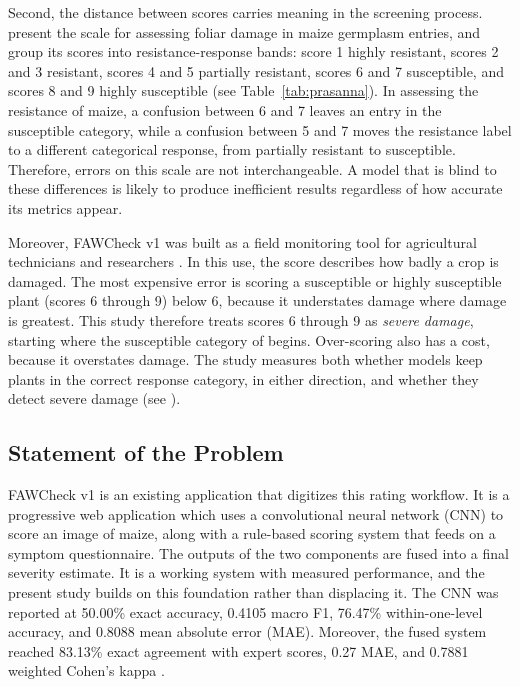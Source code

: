 \documentclass{icsthesis}
\newcommand{\secref}[1]{\textit{\nameref{#1}}}
\begin{document}
\begin{mainmatter}
				Second, the distance between scores carries meaning in the screening process.
				\citet{prasanna2018} present the scale for assessing foliar damage in maize
				germplasm entries, and group its scores into resistance-response bands: score 1
				highly resistant, scores 2 and 3 resistant, scores 4 and 5 partially resistant,
				scores 6 and 7 susceptible, and scores 8 and 9 highly susceptible (see
				Table~\ref{tab:prasanna}). In assessing the resistance of maize, a confusion between
				6 and 7 leaves an entry in the susceptible category, while a confusion between 5 and
				7 moves the resistance label to a different categorical response, from partially
				resistant to susceptible. Therefore, errors on this scale are not interchangeable. A
				model that is blind to these differences is likely to produce inefficient results
				regardless of how accurate its metrics appear.

				Moreover, FAWCheck v1 was built as a field monitoring tool for agricultural
				technicians and researchers \citep{casasola2026}. In this use, the score describes
				how badly a crop is damaged. The most expensive error is scoring a susceptible or
				highly susceptible plant (scores 6 through 9) below 6, because it understates damage
				where damage is greatest. This study therefore treats scores 6 through 9 as
				\textit{severe damage}, starting where the susceptible category of
				\citet{prasanna2018} begins. Over-scoring also has a cost, because it overstates
				damage. The study measures both whether models keep plants in the correct response
				category, in either direction, and whether they detect severe damage (see
				\secref{sec:metrics}).

			\subsection{Statement of the Problem}\label{sec:problem}

				FAWCheck v1 is an existing application that digitizes this rating workflow. It is a
				progressive web application which uses a convolutional neural network (CNN) to score
				an image of maize, along with a rule-based scoring system that feeds on a symptom
				questionnaire. The outputs of the two components are fused into a final severity
				estimate. It is a working system with measured performance, and the present study
				builds on this foundation rather than displacing it. The CNN was reported at 50.00\%
				exact accuracy, 0.4105 macro F1, 76.47\% within-one-level accuracy, and 0.8088 mean
				absolute error (MAE). Moreover, the fused system reached 83.13\% exact agreement
				with expert scores, 0.27 MAE, and 0.7881 weighted Cohen's kappa
				\citep{casasola2026}.


\end{mainmatter}
\end{document}
